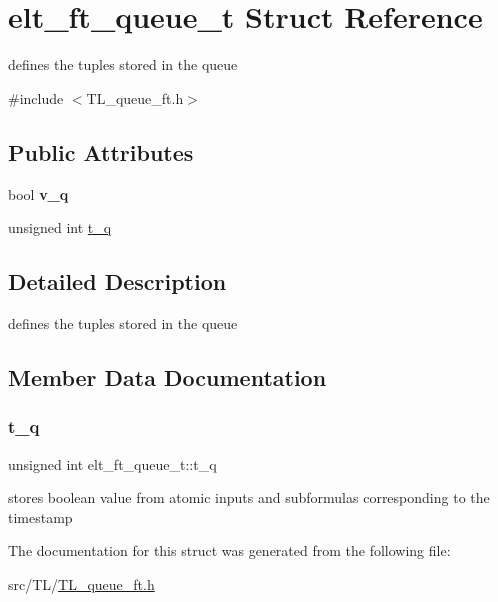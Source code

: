 \hypertarget{structelt__ft__queue__t}{}\section{elt\+\_\+ft\+\_\+queue\+\_\+t Struct Reference}
\label{structelt__ft__queue__t}


defines the tuples stored in the queue  




{\ttfamily \#include $<$T\+L\+\_\+queue\+\_\+ft.\+h$>$}

\subsection*{Public Attributes}
\begin{DoxyCompactItemize}
\item 
\mbox{\label{structelt__ft__queue__t_a480a2f44903a4b26fa522b96e531a6ed}} 
bool {\bfseries v\+\_\+q}
\item 
unsigned int \hyperlink{structelt__ft__queue__t_a8e41e06f900b427b429ff1762da6a1ef}{t\+\_\+q}
\end{DoxyCompactItemize}


\subsection{Detailed Description}
defines the tuples stored in the queue 

\subsection{Member Data Documentation}
\mbox{\label{structelt__ft__queue__t_a8e41e06f900b427b429ff1762da6a1ef}} 
\subsubsection{\texorpdfstring{t\+\_\+q}{t\_q}}
{\footnotesize\ttfamily unsigned int elt\+\_\+ft\+\_\+queue\+\_\+t\+::t\+\_\+q}

stores boolean value from atomic inputs and subformulas corresponding to the timestamp 

The documentation for this struct was generated from the following file\+:\begin{DoxyCompactItemize}
\item 
src/\+T\+L/\hyperlink{TL__queue__ft_8h}{T\+L\+\_\+queue\+\_\+ft.\+h}\end{DoxyCompactItemize}
